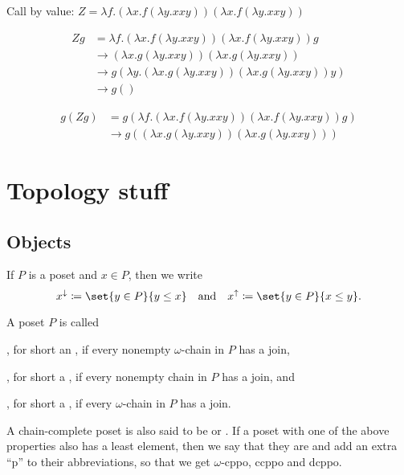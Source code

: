 \documentclass[a4paper, 11pt, article, danish, oneside]{memoir}
\newcommand{\defeq}{\coloneqq}
\newcommand{\step}{\to}
\begin{document}
Call by value: $Z = \lambda f . (\lambda x . f (\lambda y. x x y)) (\lambda x. f (\lambda y. x x y))$

\begin{align*}
    Z g
        &= \lambda f . (\lambda x . f (\lambda y. x x y)) (\lambda x. f (\lambda y. x x y)) g \\
        &\step (\lambda x . g (\lambda y. x x y)) (\lambda x. g (\lambda y. x x y)) \\
        &\step g (\lambda y. (\lambda x. g (\lambda y. x x y)) (\lambda x. g (\lambda y. x x y)) y) \\
        &\step g (  )
\end{align*}

\begin{align*}
    g (Z g)
        &= g (\lambda f . (\lambda x . f (\lambda y. x x y)) (\lambda x. f (\lambda y. x x y)) g) \\
        &\step g ((\lambda x . g (\lambda y. x x y)) (\lambda x. g (\lambda y. x x y)))
\end{align*}


\appendix

\chapter{Topology stuff}

\section{Objects}

If $P$ is a poset and $x \in P$, then we write
%
\begin{equation*}
    x^\downarrow
        \defeq \set{y \in P}{y \leq x}
    \quad \text{and} \quad
    x^\uparrow
        \defeq \set{y \in P}{x \leq y}.
\end{equation*}


\begin{definition}
    A poset $P$ is called
    \begin{enumdef}
        \item {}, for short an , if every nonempty $\omega$-chain in $P$ has a join,
        
        \item {}, for short a , if every nonempty chain in $P$ has a join, and
        
        \item {}, for short a , if every $\omega$-chain in $P$ has a join.
    \end{enumdef}
\end{definition}
%
A chain-complete poset is also said to be  or . If a poset with one of the above properties also has a least element, then we say that they are  and add an extra \enquote{p} to their abbreviations, so that we get $\omega$-cppo, ccppo and dcppo.
\end{document}
